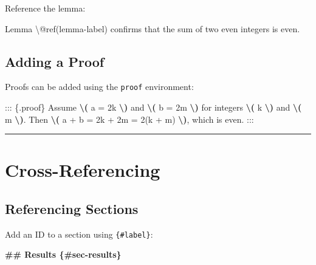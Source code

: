 \documentclass[
]{book}
\newenvironment{Shaded}{\begin{snugshade}}{\end{snugshade}}
\newcommand{\FunctionTok}[1]{\textcolor[rgb]{0.13,0.29,0.53}{\textbf{#1}}}
\newcommand{\NormalTok}[1]{#1}
\newcommand{\SpecialCharTok}[1]{\textcolor[rgb]{0.81,0.36,0.00}{\textbf{#1}}}
\theoremstyle{definition}
\theoremstyle{definition}
\theoremstyle{definition}
\theoremstyle{definition}
\theoremstyle{remark}
\begin{document}
Reference the lemma:

\begin{Shaded}
\begin{Highlighting}[]
\NormalTok{Lemma \textbackslash{}@ref(lemma{-}label) confirms that the sum of two even integers is even.}
\end{Highlighting}
\end{Shaded}

\subsection{Adding a Proof}\label{adding-a-proof}

Proofs can be added using the \texttt{proof} environment:

\begin{Shaded}
\begin{Highlighting}[]
\NormalTok{::: \{.proof\}}
\NormalTok{Assume }\SpecialCharTok{\textbackslash{}(}\NormalTok{ a = 2k }\SpecialCharTok{\textbackslash{})}\NormalTok{ and }\SpecialCharTok{\textbackslash{}(}\NormalTok{ b = 2m }\SpecialCharTok{\textbackslash{})}\NormalTok{ for integers }\SpecialCharTok{\textbackslash{}(}\NormalTok{ k }\SpecialCharTok{\textbackslash{})}\NormalTok{ and }\SpecialCharTok{\textbackslash{}(}\NormalTok{ m }\SpecialCharTok{\textbackslash{})}\NormalTok{. Then }\SpecialCharTok{\textbackslash{}(}\NormalTok{ a + b = 2k + 2m = 2(k + m) }\SpecialCharTok{\textbackslash{})}\NormalTok{, which is even.}
\NormalTok{:::}
\end{Highlighting}
\end{Shaded}

\begin{center}\rule{0.5\linewidth}{0.5pt}\end{center}

\section{Cross-Referencing}\label{cross-referencing}

\subsection{Referencing Sections}\label{referencing-sections}

Add an ID to a section using \texttt{\{\#label\}}:

\begin{Shaded}
\begin{Highlighting}[]
\FunctionTok{\#\# Results \{\#sec{-}results\}}
\end{Highlighting}
\end{Shaded}
\end{document}
